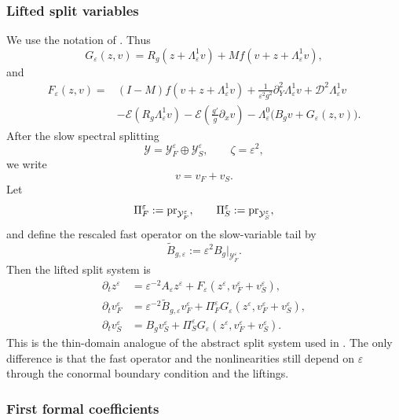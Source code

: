 \documentclass[11pt]{article}
\theoremstyle{definition}
\theoremstyle{remark}
\numberwithin{equation}{section}
\newcommand{\pr}{\textnormal{pr}}
\begin{document}
\subsubsection*{Lifted split variables}

We use the notation of . Thus
\[
G_\varepsilon(z,v)
=
R_g(z+\Lambda_\varepsilon^1v)
+
Mf(v+z+\Lambda_\varepsilon^1v),
\]
and
\begin{align*}
F_\varepsilon(z,v)
={}&
(I-M)f(v+z+\Lambda_\varepsilon^1v)
+
\frac1{\varepsilon^2g^2}\partial_Y^2\Lambda_\varepsilon^1v
+
\mathcal D^2\Lambda_\varepsilon^1v
\\
&-
\mathcal E(R_g\Lambda_\varepsilon^1v)
-
\mathcal E\!\left(\frac{g'}g\partial_xv\right)
-
\Lambda_\varepsilon^0
\bigl(B_gv+G_\varepsilon(z,v)\bigr).
\end{align*}
After the slow spectral splitting
\[
\mathcal Y
=
\mathcal Y_F^\varepsilon\oplus\mathcal Y_S^\varepsilon,
\qquad
\zeta=\varepsilon^2,
\]
we write
\[
v=v_F+v_S.
\]
Let
\[
\Pi_F^\varepsilon:=\pr_{\mathcal Y_F^\varepsilon},
\qquad
\Pi_S^\varepsilon:=\pr_{\mathcal Y_S^\varepsilon},
\]
and define the rescaled fast operator on the slow-variable tail by
\[
\widetilde B_{g,\varepsilon}
:=
\varepsilon^2B_g|_{\mathcal Y_F^\varepsilon}.
\]
Then the lifted split system is
\begin{align}
\label{eq:thin-lifted-split-system}
\partial_t z^\varepsilon
&=
\varepsilon^{-2}A_\varepsilon z^\varepsilon
+
F_\varepsilon(z^\varepsilon,v_F^\varepsilon+v_S^\varepsilon),
\\
\partial_t v_F^\varepsilon
&=
\varepsilon^{-2}\widetilde B_{g,\varepsilon}v_F^\varepsilon
+
\Pi_F^\varepsilon
G_\varepsilon(z^\varepsilon,v_F^\varepsilon+v_S^\varepsilon),
\\
\partial_t v_S^\varepsilon
&=
B_gv_S^\varepsilon
+
\Pi_S^\varepsilon
G_\varepsilon(z^\varepsilon,v_F^\varepsilon+v_S^\varepsilon).
\end{align}
This is the thin-domain analogue of the abstract split system used in
. The only difference is that the
fast operator and the nonlinearities still depend on \(\varepsilon\) through
the conormal boundary condition and the liftings.

\subsubsection*{First formal coefficients}
\end{document}
